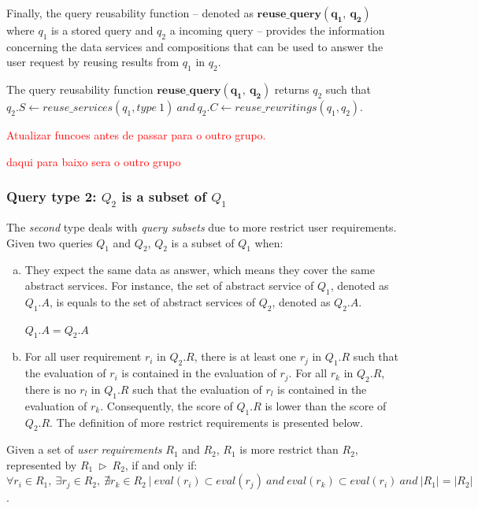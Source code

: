 Finally, the query reusability function -- denoted as $\mathbf{reuse\_query(q_{1}, \ q_{2})}$ where $q_{1}$ is a stored query and $q_{2}$ a incoming query -- provides the information concerning the data services and compositions that can be used to answer the user request by reusing results from $q_{1}$ in $q_{2}$. 

\begin{definition}
The query reusability function $\mathbf{reuse\_query(q_{1}, \ q_{2})}$ returns $q_{2}$ such that $q_{2}.S \leftarrow reuse\_services(q_{1}, type\ 1) \ and \ q_{2}.C \leftarrow reuse\_rewritings(q_{1}, q_{2})$.
\end{definition}

\textcolor{red}{Atualizar funcoes antes de passar para o outro grupo.}

\textcolor{red}{daqui para baixo sera o outro grupo}
\subsubsection{Query type 2: $Q_{2}$ is a subset of $Q_{1}$}

The \textit{second} type deals with \textit{query subsets} due to more restrict user requirements. Given two queries $Q_{1}$ and $Q_{2}$, $Q_{2}$ is a subset of $Q_{1}$ when:
%
\begin{enumerate}[a)]
\item They expect the same data as answer, which means they cover the same abstract services. 
For instance, the set of abstract service of $Q_{1}$, denoted as $Q_{1}.A$, is equals to the set of abstract services of $Q_{2}$, denoted as $Q_{2}.A$.
%
\begin{center}
$Q_{1}.A = Q_{2}.A$
\end{center}
%
\item For all user requirement $r_{i}$ in $Q_{2}.R$, there is at least one $r_{j}$ in $Q_{1}.R$ such that the evaluation of $r_{i}$ is contained in the evaluation of $r_{j}$. 
For all $r_{k}$ in $Q_{2}.R$, there is no $r_{l}$ in $Q_{1}.R$ such that the evaluation of $r_{l}$ is contained in the evaluation of $r_{k}$. 
Consequently, the score of $Q_{1}.R$ is lower than the score of $Q_{2}.R$. The definition of more restrict requirements is presented below.
\end{enumerate}

\begin{definition}\label{def:reqmore}
Given a set of \textsl{user requirements} $R_{1}$ and $R_{2}$, $R_{1}$ is more restrict than $R_{2}$, represented by $R_{1} \ \rhd \ R_{2}$, if and only if: $\forall r_{i} \in R_{1}, \ \exists r_{j} \in R_{2}, \ \nexists r_{k} \in R_{2} \ \vert \ eval (r_{i}) \subset eval(r_{j}) \ and \ eval (r_{k}) \subset eval(r_{i}) \ and \ \vert R_{1} \vert = \vert R_{2} \vert$.
\end{definition}

